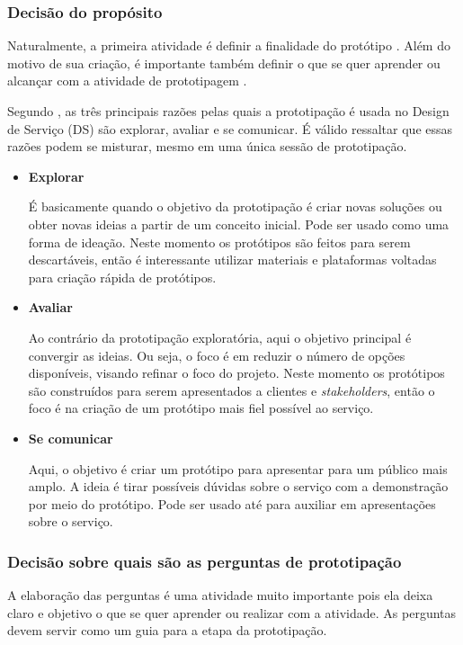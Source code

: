 \subsubsection{Decisão do propósito}

Naturalmente, a primeira atividade é definir a finalidade do protótipo \cite{paust2025integrative}. Além do motivo de sua criação, é importante também definir o que se quer aprender ou alcançar com a atividade de prototipagem \cite{mager2023product}.

Segundo \cite{Stickdorn2019}, as três principais razões pelas quais a prototipação é usada no Design de Serviço (DS) são explorar, avaliar e se comunicar. É válido ressaltar que essas razões podem se misturar, mesmo em uma única sessão de prototipação.

\begin{itemize}
	\item \textbf{Explorar}
	
	É basicamente quando o objetivo da prototipação é criar novas soluções ou obter novas ideias a partir de um conceito inicial. Pode ser usado como uma forma de ideação. Neste momento os protótipos são feitos para serem descartáveis, então é interessante utilizar materiais e plataformas voltadas para criação rápida de protótipos.
	
	\item \textbf{Avaliar}
	
	Ao contrário da prototipação exploratória, aqui o objetivo principal é convergir as ideias. Ou seja, o foco é em reduzir o número de opções disponíveis, visando refinar o foco do projeto. Neste momento os protótipos são construídos para serem apresentados a clientes e \textit{stakeholders}, então o foco é na criação de um protótipo mais fiel possível ao serviço.
	
	\item \textbf{Se comunicar}
	
	Aqui, o objetivo é criar um protótipo para apresentar para um público mais amplo. A ideia é tirar possíveis dúvidas sobre o serviço com a demonstração por meio do protótipo. Pode ser usado até para auxiliar em apresentações sobre o serviço.
\end{itemize}

\subsubsection{Decisão sobre quais são as perguntas de prototipação}

A elaboração das perguntas é uma atividade muito importante pois ela deixa claro e objetivo o que se quer aprender ou realizar com a atividade. As perguntas devem servir como um guia para a etapa da prototipação.

